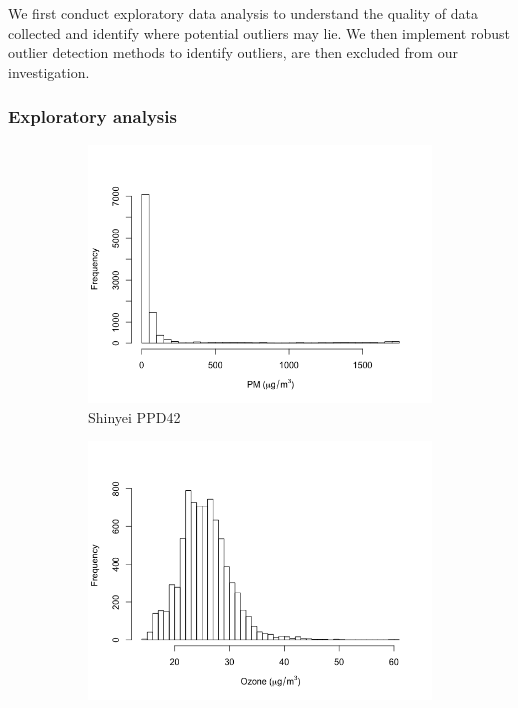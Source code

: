 \documentclass[11pt]{report}
\begin{document}
We first conduct exploratory data analysis to understand the quality of data collected and identify where potential outliers may lie. We then implement robust outlier detection methods to identify outliers, are then excluded from our investigation.

\subsubsection{Exploratory analysis}

\begin{figure}[!tbp]
    \centering
    \begin{minipage}{1\linewidth}
            \begin{subfigure}[t]{.5\linewidth}
                \includegraphics[width=\textwidth]{images/pm_histogram}
                \caption{Shinyei PPD42}
                \label{fig:pm_histogram}
            \end{subfigure}
            \begin{subfigure}[t]{.5\linewidth}
            	\includegraphics[width=\textwidth]{images/ozone_histogram}

\end{subfigure}
\end{minipage}
\end{figure}
\end{document}
